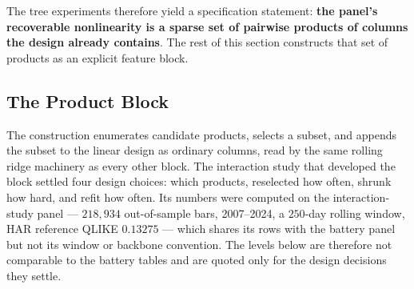 The tree experiments therefore yield a specification statement:
\textbf{the panel's recoverable nonlinearity is a sparse set of pairwise
products of columns the design already contains}. The rest of this section
constructs that set of products as an explicit feature block.

\subsection{The Product Block}
\label{sec:product_block}

The construction enumerates candidate products, selects a subset, and
appends the subset to the linear design as ordinary columns, read by the
same rolling ridge machinery as every other block. The interaction study
that developed the block settled four design choices: which products,
reselected how often, shrunk how hard, and refit how often. Its numbers
were computed on the interaction-study panel --- $218{,}934$ out-of-sample
bars, 2007--2024, a $250$-day rolling window, HAR reference QLIKE
$0.13275$ --- which shares its rows with the battery panel but not its
window or backbone convention. The levels below are therefore not
comparable to the battery tables and are quoted only for the design
decisions they settle.

